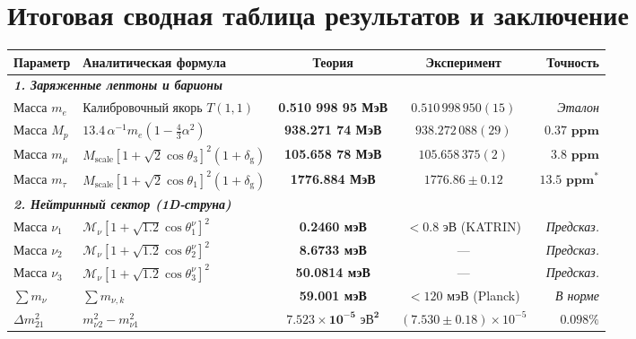 \documentclass[12pt,a4paper]{article}
\begin{document}
	\newpage
	\section{Итоговая сводная таблица результатов и заключение}

	\begin{table}[h!]
		\centering
		\footnotesize
		\renewcommand{\arraystretch}{1.25}
		\begin{tabularx}{\textwidth}{l p{4.6cm} c c r}
			\toprule
			\textbf{Параметр} & \textbf{Аналитическая формула} & \textbf{Теория} & \textbf{Эксперимент} & \textbf{Точность} \\
			\midrule
			\multicolumn{5}{l}{\textit{\textbf{1. Заряженные лептоны и барионы}}} \\
			Масса $m_e$ & Калибровочный якорь $T(1,1)$ & \textbf{0.510 998 95 МэВ} & $0.510\,998\,950(15)$ & \textit{Эталон} \\
			Масса $M_p$ & $13.4 \, \alpha^{-1} m_e (1 - \frac{4}{3}\alpha^2)$ & \textbf{938.271 74 МэВ} & $938.272\,088(29)$ & $\mathbf{0.37 \text{ ppm}}$ \\
			Масса $m_\mu$ & $M_{\text{scale}} [1+\sqrt{2}\cos\theta_3]^2 (1+\delta_{\text{g}})$ & \textbf{105.658 78 МэВ} & $105.658\,375(2)$ & $\mathbf{3.8 \text{ ppm}}$ \\
			Масса $m_\tau$ & $M_{\text{scale}} [1+\sqrt{2}\cos\theta_1]^2 (1+\delta_{\text{g}})$ & \textbf{1776.884 МэВ} & $1776.86 \pm 0.12$ & $\mathbf{13.5 \text{ ppm}}^*$ \\
			\midrule
			\multicolumn{5}{l}{\textit{\textbf{2. Нейтринный сектор (1D-струна)}}} \\
			Масса $\nu_1$ & $\mathcal{M}_\nu [1 + \sqrt{1.2}\cos\theta_1^\nu]^2$ & \textbf{0.2460 мэВ} & $< 0.8$ эВ (KATRIN) & \textit{Предсказ.} \\
			Масса $\nu_2$ & $\mathcal{M}_\nu [1 + \sqrt{1.2}\cos\theta_2^\nu]^2$ & \textbf{8.6733 мэВ} & --- & \textit{Предсказ.} \\
			Масса $\nu_3$ & $\mathcal{M}_\nu [1 + \sqrt{1.2}\cos\theta_3^\nu]^2$ & \textbf{50.0814 мэВ} & --- & \textit{Предсказ.} \\
			$\sum m_\nu$ & $\sum m_{\nu, k}$ & \textbf{59.001 мэВ} & $< 120$ мэВ (Planck) & \textit{В норме} \\
			$\Delta m_{21}^2$ & $m_{\nu 2}^2 - m_{\nu 1}^2$ & $\mathbf{7.523 \times 10^{-5} \text{ эВ}^2}$ & $(7.530 \pm 0.18) \times 10^{-5}$ & $\mathbf{0.098\%}$ \\

\end{tabularx}
\end{table}
\end{document}
